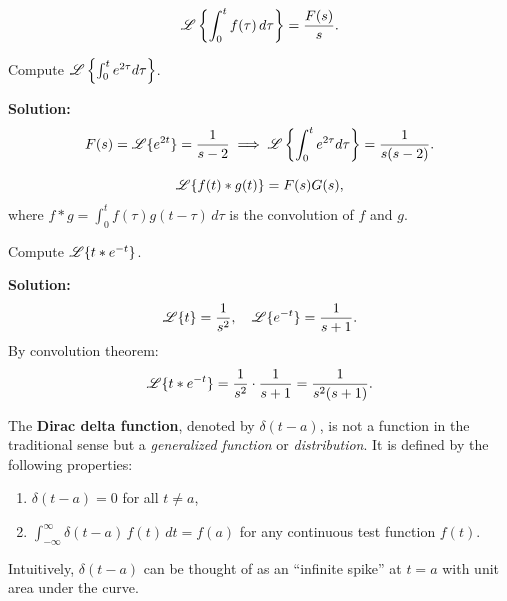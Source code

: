   \begin{theorem}
    \[
    \operatorname{\mathscr{L}}\left\{\int_0^t f(\tau)\,d\tau\right\} = \frac{F(s)}{s}.
    \]
  \end{theorem}

  \begin{example}
    Compute $\operatorname{\mathscr{L}}\left\{\int_0^t e^{2\tau} d\tau\right\}$.

    \textbf{Solution:}  
    \[
    F(s) = \operatorname{\mathscr{L}}\{e^{2t}\} = \frac{1}{s-2} \implies 
    \operatorname{\mathscr{L}}\left\{\int_0^t e^{2\tau} d\tau\right\} = \frac{1}{s(s-2)}.
    \]
  \end{example}


  \begin{theorem}
    \[
    \operatorname{\mathscr{L}}\{f(t) * g(t)\} = F(s) G(s),
    \]
    where $f*g = \int_0^t f(\tau) g(t-\tau)\,d\tau$ is the convolution of $f$ and $g$.
  \end{theorem}

  \begin{example}
    Compute $\operatorname{\mathscr{L}}\{t * e^{-t}\}$.

    \textbf{Solution:}  
    \[
    \operatorname{\mathscr{L}}\{t\} = \frac{1}{s^2},\quad \operatorname{\mathscr{L}}\{e^{-t}\} = \frac{1}{s+1}.
    \]
    By convolution theorem:
    \[
    \operatorname{\mathscr{L}}\{t * e^{-t}\} = \frac{1}{s^2} \cdot \frac{1}{s+1} = \frac{1}{s^2 (s+1)}.
    \]
  \end{example}


  \begin{marginfigure}
    
  \end{marginfigure}


  \begin{definition}
    The \textbf{Dirac delta function}, denoted by $\delta(t-a)$, is not a function in the traditional sense but a \emph{generalized function} or \emph{distribution}. It is defined by the following properties:
    \begin{enumerate}
      \item $\delta(t-a) = 0$ for all $t \neq a$,
      \item $\displaystyle \int_{-\infty}^\infty \delta(t-a)\, f(t)\, dt = f(a)$ for any continuous test function $f(t)$.
    \end{enumerate}
  \end{definition}

  \begin{highlight}
    Intuitively, $\delta(t-a)$ can be thought of as an ``infinite spike'' at $t=a$ with unit area under the curve.  
  \end{highlight}

